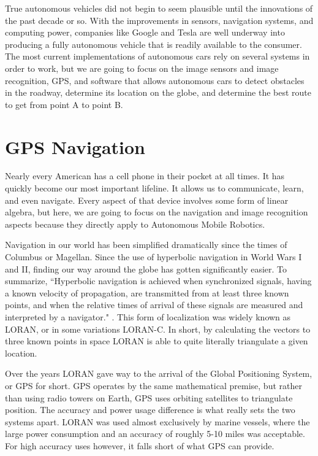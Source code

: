 \documentclass[12pt]{article}
\begin{document}
True autonomous vehicles did not begin to seem plausible until the innovations of the past decade or so. With the improvements in sensors, navigation systems, and computing power, companies like Google and Tesla are well underway into producing a fully autonomous vehicle that is readily available to the consumer. The most current implementations of autonomous cars rely on several systems in order to work, but we are going to focus on the image sensors and image recognition, GPS, and software that allows autonomous cars to detect obstacles in the roadway, determine its location on the globe, and determine the best route to get from point A to point B.\cite{GoogleCar}


\newpage
\section{GPS Navigation}
\quad Nearly every American has a cell phone in their pocket at all times. It has quickly become our most important lifeline. It allows us to communicate, learn, and even navigate. Every aspect of that device involves some form of linear algebra, but here, we are going to focus on the navigation and image recognition aspects because they directly apply to Autonomous Mobile Robotics.\newline

Navigation in our world has been simplified dramatically since the times of Columbus or Magellan. Since the use of hyperbolic navigation in World Wars I and II, finding our way around the globe has gotten significantly easier. To summarize, “Hyperbolic navigation is achieved when synchronized signals, having a known velocity of propagation, are transmitted from at least three known points, and when the relative times of arrival of these signals are measured and interpreted by a navigator." \cite{hyperNavigation}. This form of localization was widely known as LORAN, or in some variations LORAN-C. In short, by calculating the vectors to three known points in space LORAN is able to quite literally triangulate a given location. \newline

Over the years LORAN gave way to the arrival of the Global Positioning System, or GPS for short. GPS operates by the same mathematical premise, but rather than using radio towers on Earth, GPS uses orbiting satellites to triangulate position. The accuracy and power usage difference is what really sets the two systems apart. LORAN was used almost exclusively by marine vessels, where the large power consumption and an accuracy of roughly 5-10 miles was acceptable. For high accuracy uses however, it falls short of what GPS can provide. \newline
\end{document}
